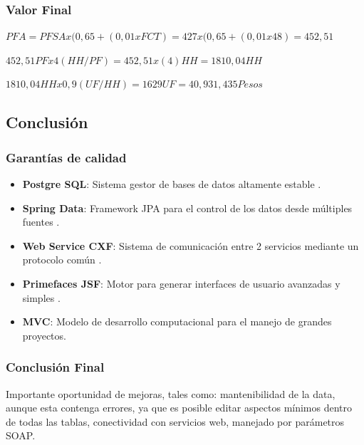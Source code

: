 \documentclass{beamer}
\begin{document}

\begin{frame}
\frametitle{Valor Final}
\begin{theorem}
$PFA = PFSA x (0,65 + (0,01 x FCT) = 427 x (0,65 + (0,01 x 48) = 452,51$
\end{theorem}
\begin{theorem}
$452,51PF x 4(HH/PF) = 452,51 x (4)HH = 1810,04HH$
\end{theorem}
\begin{theorem}
$1810,04HH x 0,9(UF/HH) = 1629UF = 40,931,435Pesos$
\end{theorem}
\end{frame}


\subsection{Conclusión}


\begin{frame}
\frametitle{Garantías de calidad}
\begin{itemize}
\item \textbf{Postgre SQL}: Sistema gestor de bases de datos altamente estable \cite{p2}.
\item \textbf{Spring Data}: Framework JPA para el control de los datos desde múltiples fuentes \cite{p3}.
\item \textbf{Web Service CXF}: Sistema de comunicación entre 2 servicios mediante un protocolo común \cite{p4}.
\item \textbf{Primefaces JSF}: Motor para generar interfaces de usuario avanzadas y simples \cite{p5}.
\item \textbf{MVC}: Modelo de desarrollo computacional para el manejo de grandes proyectos.
\end{itemize}
\end{frame}


\begin{frame}
\frametitle{Conclusión Final}
\begin{block}{}
Importante oportunidad de mejoras, tales como: mantenibilidad de la data, aunque esta contenga errores, ya que es posible editar aspectos mínimos dentro de todas las tablas, conectividad con servicios web, manejado por parámetros SOAP.
\end{block}
\end{frame}
\end{document}

